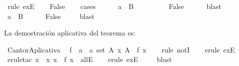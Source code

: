 \begin{isabellebody}
\ {\isacharparenleft}rule\ exE{\isacharparenright}\isanewline
\ \ \isamarkupfalse%
\ False\isanewline
\ \ \isamarkupfalse%
\ {\isacharparenleft}cases{\isacharparenright}\isanewline
\ \ \ \ \isamarkupfalse%
\ {\isachardoublequoteopen}a\ {\isasymin}\ {\isacharquery}B{\isachardoublequoteclose}\ \ \isanewline
\ \ \ \ \isamarkupfalse%
\ \isamarkupfalse%
\ False\ \ \isamarkupfalse%
\ {}\ \isamarkupfalse%
\ blast\isanewline
\ \ \isamarkupfalse%
\ \isanewline
\ \ \ \ \isamarkupfalse%
\ {\isachardoublequoteopen}a\ {\isasymnotin}\ {\isacharquery}B{\isachardoublequoteclose}\isanewline
\ \ \ \ \isamarkupfalse%
\ False\ \isamarkupfalse%
\ {}\ \isamarkupfalse%
\ blast\isanewline
\ \ \isamarkupfalse%
\isanewline
{}\isamarkupfalse%
%
\endisatagproof
{\isafoldproof}%
%
\isadelimproof
%
\endisadelimproof
%
\isadelimdocument
%
\endisadelimdocument
%
\isatagdocument
%
\isamarkuptrue%
%
\endisatagdocument
{\isafolddocument}%
%
\isadelimdocument
%
\endisadelimdocument
%
\begin{isamarkuptext}%
La demostración aplicativa del teorema es:%
\end{isamarkuptext}\isamarkuptrue%
\isamarkupfalse%
\ CantorAplicativa\ {\isacharcolon}\isanewline
\ {\isachardoublequoteopen}{\isasymnexists}f\ {\isacharcolon}{\isacharcolon}\ {\isacharprime}a\ {\isasymRightarrow}\ {\isacharprime}a\ set{\isachardot}\ {\isasymforall}A{\isachardot}\ {\isasymexists}x{\isachardot}\ A\ {\isacharequal}\ f\ x{\isachardoublequoteclose}\isanewline
%
\isadelimproof
\ \ %
\endisadelimproof
%
\isatagproof
{}\isamarkupfalse%
\ {\isacharparenleft}rule\ notI{\isacharparenright}\isanewline
\ \ \isamarkupfalse%
\ {\isacharparenleft}erule\ exE{\isacharparenright}\isanewline
\ \ \isamarkupfalse%
\ {\isacharparenleft}erule{\isacharunderscore}tac\ x\ {\isacharequal}\ {\isachardoublequoteopen}{\isacharbraceleft}x{\isachardot}\ x\ {\isasymnotin}\ f\ x{\isacharbraceright}{\isachardoublequoteclose}\ \ allE{\isacharparenright}\isanewline
\ \ \isamarkupfalse%
\ {\isacharparenleft}erule\ exE{\isacharparenright}\isanewline
\ \ \isamarkupfalse%
\ \ blast\ \isanewline
\ \ \isamarkupfalse%
%
\endisatagproof
{\isafoldproof}%
%

\end{isabellebody}
